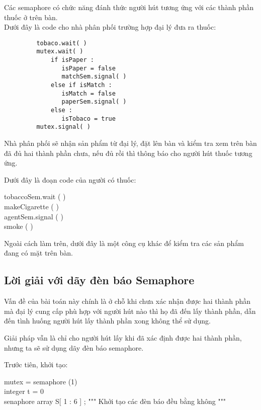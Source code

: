 \documentclass[a4paper]{article}
\begin{document}
	
	\hspace{4mm}Các semaphore có chức năng đánh thức người hút tương ứng với các thành phần thuốc ở trên bàn. \\
	Dưới đây là code cho nhà phân phối trường hợp đại lý đưa ra thuốc:
	\begin{tcolorbox}
		\begin{verbatim}
		 tobaco.wait( )
		 mutex.wait( ) 
		     if isPaper : 
		        isPaper = false
		        matchSem.signal( )
		     else if isMatch : 
		        isMatch = false
		        paperSem.signal( )
		     else :
		        isTobaco = true
		 mutex.signal( )
		\end{verbatim}
	\end{tcolorbox}

	Nhà phân phối sẽ nhận sản phẩm từ đại lý, đặt lên bàn và kiểm 
	tra xem trên bàn đã đủ hai thành phần chưa, nếu đủ rồi thì thông báo cho người hút thuốc tương ứng.

	Dưới đây là đoạn code của người có thuốc:

	\begin{tcolorbox}
		tobaccoSem.wait ( ) \\
		makeCigarette ( ) \\ 
		agentSem.signal ( ) \\
		smoke ( )
	\end{tcolorbox}
	
	Ngoài cách làm trên, dưới đây là một công cụ khác để kiểm tra các sản phẩm đang có mặt trên bàn.

	\subsection{Lời giải với dãy đèn báo Semaphore \cite{r3}}	
	Vấn đề của bài toán này chính là ở chỗ khi chưa xác nhận được hai thành phần mà đại lý cung cấp phù hợp với 
	người hút nào thì họ đã đến lấy thành phần, dẫn đến tình huống người hút lấy thành phần xong không thể sử dụng.
	
	Giải pháp vẫn là chỉ cho người hút lấy khi đã xác định được hai thành phần, nhưng ta sẽ sử dụng dãy đèn báo 
	semaphore.

	Trước tiên, khởi tạo:
	
	\begin{center}
		\begin{tcolorbox}
		mutex = semaphore (1) \\
		integer t = 0 \\ 
		senaphore array S[ 1 : 6 ] ; """ Khởi tạo các đèn báo đều bằng không """
		\end{tcolorbox}
	\end{center}
	
\end{document}
